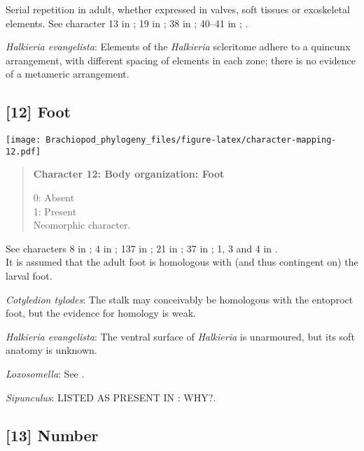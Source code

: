 \documentclass[openany]{book}
\theoremstyle{definition}
\theoremstyle{definition}
\theoremstyle{definition}
\theoremstyle{remark}
\begin{document}
Serial repetition in adult, whether expressed in valves, soft tissues or
exoskeletal elements. See character 13 in \citet{Rouse1999}; 19 in
\citet{Vinther2008}; 38 in \citet{Haszprunar1996}; 40--41 in
\citet{Sutton2012}; \citet{Wanninger2009}.

\hypertarget{Halkieria_evangelista-coding-11}{}
\emph{Halkieria evangelista}: Elements of the \emph{Halkieria}
scleritome adhere to a quincunx arrangement, with different spacing of
elements in each zone; there is no evidence of a metameric arrangement.

\subsection*{{[}12{]} Foot}\label{foot}

\texttt{[image: Brachiopod\_phylogeny\_files/figure-latex/character-mapping-12.pdf]}

\begin{quote}
\textbf{Character 12: Body organization: Foot}

0: Absent\\
1: Present\\
Neomorphic character.
\end{quote}

See characters 8 in \citet{Haszprunar1996}; 4 in \citet{Vinther2008};
137 in \citet{Rouse1999}; 21 in \citet{BucklandNicks2008}; 37 in
\citet{Sutton2012}; 1, 3 and 4 in \citet{Haszprunar2008}.\\
It is assumed that the adult foot is homologous with (and thus
contingent on) the larval foot.

\hypertarget{Cotyledion_tylodes-coding-12}{}
\emph{Cotyledion tylodes}: The stalk may conceivably be homologous with
the entoproct foot, but the evidence for homology is weak.

\hypertarget{Halkieria_evangelista-coding-12}{}
\emph{Halkieria evangelista}: The ventral surface of \emph{Halkieria} is
unarmoured, but its soft anatomy is unknown.

\hypertarget{Loxosomella-coding-12}{}
\emph{Loxosomella}: See \citet{Haszprunar2008}.

\hypertarget{Sipunculus-coding-12}{}
\emph{Sipunculus}: LISTED AS PRESENT IN \citet{Smith2012}: WHY?.

\subsection*{{[}13{]} Number}\label{number-1}
\end{document}
